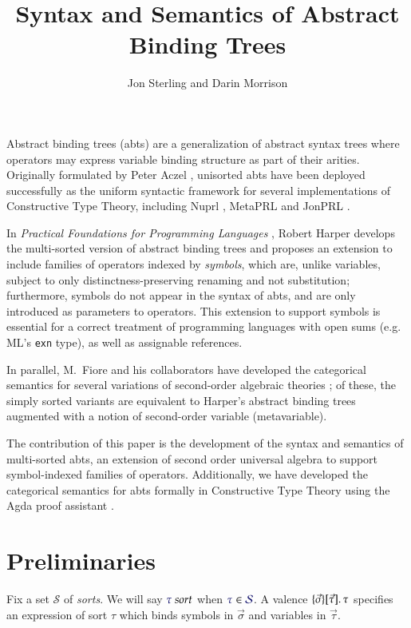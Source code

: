 \documentclass[11pt]{article}
\theoremstyle{definition}
\theoremstyle{remark}
\numberwithin{equation}{section}
\def\IModeColorName{MidnightBlue}
\newcommand\IMode[1]{{\color{\IModeColorName}{#1}}}
\newcommand\Member[2]{\IMode{#1}\in\IMode{#2}}
\newcommand\MkValence[3]{%
  \ifthenelse{\equal{#1}{}}{}{%
    \{#1\}%
  }%
  \ifthenelse{\equal{#2}{}}{}{%
    [#2]%
  }.\, #3%
}
\newcommand\IsSort[1]{\IMode{#1}\ \textit{sort}}
\newcommand\Sorts{\mathcal{S}}
\begin{document}
\title{Syntax and Semantics of Abstract Binding Trees}
\date{}
\author{Jon Sterling and Darin Morrison}
\maketitle

Abstract binding trees (abts) are a generalization of abstract syntax trees
where operators may express variable binding structure as part of their
arities.  Originally formulated by Peter Aczel \cite{aczel:1978}, unisorted
abts have been deployed successfully as the uniform syntactic framework for
several implementations of Constructive Type Theory, including Nuprl
\cite{constable:1986}, MetaPRL \cite{hickey:2003} and JonPRL
\cite{jonprl:2015}.

In \emph{Practical Foundations for Programming Languages} \cite{harper:2016},
Robert Harper develops the multi-sorted version of abstract binding trees and
proposes an extension to include families of operators indexed by
\emph{symbols}, which are, unlike variables, subject to only
distinctness-preserving renaming and not substitution; furthermore, symbols do
not appear in the syntax of abts, and are only introduced as parameters to
operators. This extension to support symbols is essential for a
correct treatment of programming languages with open sums (e.g. ML's
\texttt{exn} type), as well as assignable references.

In parallel, M.\ Fiore and his collaborators have developed the categorical
semantics for several variations of second-order algebraic theories
\cite{fiore:1999, fiore:2005, fiore-hur:2010, fiore-mamoud:2010}; of these, the
simply sorted variants are equivalent to Harper's abstract binding trees
augmented with a notion of second-order variable (metavariable).

The contribution of this paper is the development of the syntax and semantics
of multi-sorted abts, an extension of second order universal
algebra to support symbol-indexed families of operators. Additionally, we have
developed the categorical semantics for abts formally in Constructive
Type Theory using the Agda proof assistant \cite{norell:2007}.

\section{Preliminaries}

Fix a set $\Sorts$ of \emph{sorts}. We will say $\IsSort{\tau}$ when
$\Member{\tau}{\Sorts}$. A valence $\MkValence{\vec{\sigma}}{\vec{\tau}}{\tau}$ specifies an
expression of sort $\tau$ which binds symbols in $\vec{\sigma}$ and variables in
$\vec{\tau}$.
\end{document}
